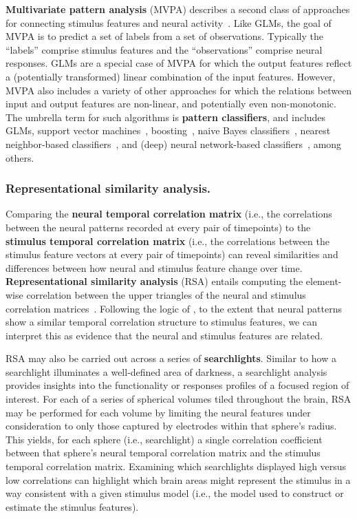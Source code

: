 \documentclass[runningheads]{llncs}
\begin{document}
\textbf{Multivariate pattern analysis} (MVPA) describes a second class
of approaches for connecting stimulus features and neural
activity~\citep{HaxbEtal01, NormEtal06b}.  Like GLMs, the goal of MVPA
is to predict a set of labels from a set of observations.  Typically
the ``labels'' comprise stimulus features and the ``observations''
comprise neural responses.  GLMs are a special case of MVPA for which
the output features reflect a (potentially transformed) linear
combination of the input features.  However, MVPA also includes a
variety of other approaches for which the relations between input and
output features are non-linear, and potentially even non-monotonic.
The umbrella term for such algorithms is \textbf{pattern classifiers},
and includes GLMs, support vector machines~\citep{BoseEtal92},
boosting~\citep{Scha03}, naive Bayes classifiers~\citep{CortVapn95,
  Nobl04, LeeEtal12}, nearest neighbor-based
classifiers~\citep{FixHodg51}, and (deep) neural network-based
classifiers~\citep{ZengEtal14, Wan90}, among others.


\subsubsection{Representational similarity analysis.}
Comparing the \textbf{neural temporal correlation matrix} (i.e., the
correlations between the neural patterns recorded at every pair of
timepoints) to the \textbf{stimulus temporal correlation matrix}
(i.e., the correlations between the stimulus feature vectors at every
pair of timepoints) can reveal similarities and differences between
how neural and stimulus feature change over time.
\textbf{Representational similarity analysis} (RSA) entails computing
the element-wise correlation between the upper triangles of the neural
and stimulus correlation matrices~\citep{KrieEtal08b}.  Following the
logic of \cite{KrieEtal08b}, to the extent that neural patterns show a
similar temporal correlation structure to stimulus features, we can
interpret this as evidence that the neural and stimulus features are
related.

RSA may also be carried out across a series of \textbf{searchlights}.
Similar to how a searchlight illuminates a well-defined area of
darkness, a searchlight analysis provides insights into the
functionality or responses profiles of a focused region
of interest.  For each of a series of spherical volumes tiled
throughout the brain, RSA may be performed for each volume by limiting
the neural features under consideration to only those captured by
electrodes within that sphere's radius.  This yields, for each sphere
(i.e., searchlight) a single correlation coefficient between that
sphere's neural temporal correlation matrix and the stimulus temporal
correlation matrix.  Examining which searchlights displayed high
versus low correlations can highlight which brain areas might
represent the stimulus in a way consistent with a given stimulus
model (i.e., the model used to construct or estimate the stimulus
features).
\end{document}
